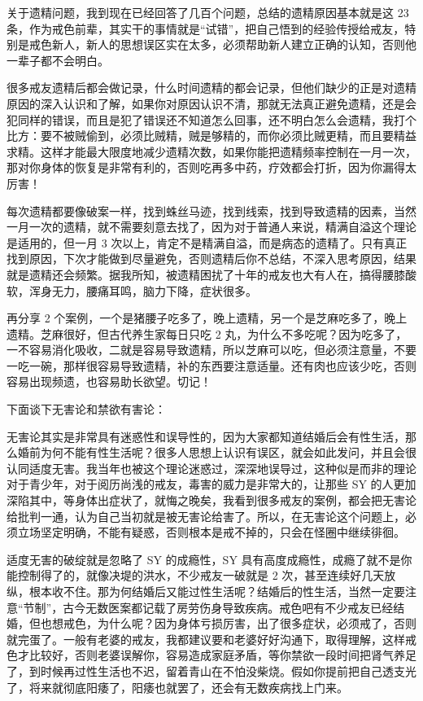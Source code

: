 \documentclass[fontset=founder]{ctexart}
\begin{document}
关于遗精问题，我到现在已经回答了几百个问题，总结的遗精原因基本就是这 23 条，作为戒色前辈，其实干的事情就是“试错”，把自己悟到的经验传授给戒友，特别是戒色新人，新人的思想误区实在太多，必须帮助新人建立正确的认知，否则他一辈子都不会明白。

很多戒友遗精后都会做记录，什么时间遗精的都会记录，但他们缺少的正是对遗精原因的深入认识和了解，如果你对原因认识不清，那就无法真正避免遗精，还是会犯同样的错误，而且是犯了错误还不知道怎么回事，还不明白怎么会遗精，我打个比方：要不被贼偷到，必须比贼精，贼是够精的，而你必须比贼更精，而且要精益求精。这样才能最大限度地减少遗精次数，如果你能把遗精频率控制在一月一次，那对你身体的恢复是非常有利的，否则吃再多中药，疗效都会打折，因为你漏得太厉害！

每次遗精都要像破案一样，找到蛛丝马迹，找到线索，找到导致遗精的因素，当然一月一次的遗精，就不需要刻意去找了，因为对于普通人来说，精满自溢这个理论是适用的，但一月 3 次以上，肯定不是精满自溢，而是病态的遗精了。只有真正找到原因，下次才能做到尽量避免，否则遗精后你不总结，不深入思考原因，结果就是遗精还会频繁。据我所知，被遗精困扰了十年的戒友也大有人在，搞得腰膝酸软，浑身无力，腰痛耳鸣，脑力下降，症状很多。

再分享 2 个案例，一个是猪腰子吃多了，晚上遗精，另一个是芝麻吃多了，晚上遗精。芝麻很好，但古代养生家每日只吃 2 丸，为什么不多吃呢？因为吃多了，一不容易消化吸收，二就是容易导致遗精，所以芝麻可以吃，但必须注意量，不要一吃一碗，那样很容易导致遗精，补的东西要注意适量。还有肉也应该少吃，否则容易出现频遗，也容易助长欲望。切记！

下面谈下无害论和禁欲有害论：

无害论其实是非常具有迷惑性和误导性的，因为大家都知道结婚后会有性生活，那么婚前为何不能有性生活呢？很多人思想上认识有误区，就会如此发问，并且会很认同适度无害。我当年也被这个理论迷惑过，深深地误导过，这种似是而非的理论对于青少年，对于阅历尚浅的戒友，毒害的威力是非常大的，让那些 SY 的人更加深陷其中，等身体出症状了，就悔之晚矣，我看到很多戒友的案例，都会把无害论给批判一通，认为自己当初就是被无害论给害了。所以，在无害论这个问题上，必须立场坚定明确，不能有疑惑，否则根本是戒不掉的，只会在怪圈中继续徘徊。

适度无害的破绽就是忽略了 SY 的成瘾性，SY 具有高度成瘾性，成瘾了就不是你能控制得了的，就像决堤的洪水，不少戒友一破就是 2 次，甚至连续好几天放纵，根本收不住。那为何结婚后又能过性生活呢？结婚后的性生活，当然一定要注意“节制”，古今无数医案都记载了房劳伤身导致疾病。戒色吧有不少戒友已经结婚，但也想戒色，为什么呢？因为身体亏损厉害，出了很多症状，必须戒了，否则就完蛋了。一般有老婆的戒友，我都建议要和老婆好好沟通下，取得理解，这样戒色才比较好，否则老婆误解你，容易造成家庭矛盾，等你禁欲一段时间把肾气养足了，到时候再过性生活也不迟，留着青山在不怕没柴烧。假如你提前把自己透支光了，将来就彻底阳痿了，阳痿也就罢了，还会有无数疾病找上门来。
\end{document}

